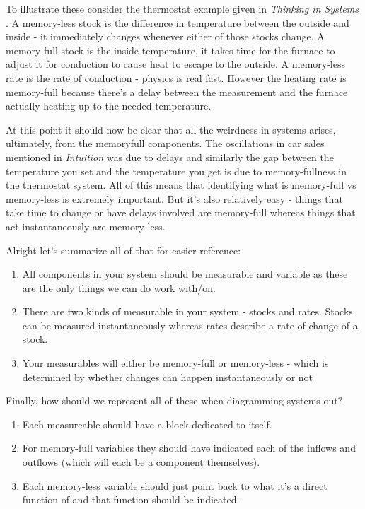 \documentclass[11pt,a5paper]{book}
\begin{document}
To illustrate these consider the thermostat example given in \textit{Thinking in Systems} \cite{meadows}. A memory-less stock is the difference in temperature between the outside and inside - it immediately changes whenever either of those stocks change. A memory-full stock is the inside temperature, it takes time for the furnace to adjust it for conduction to cause heat to escape to the outside. A memory-less rate is the rate of conduction - physics is real fast. However the heating rate is memory-full because there's a delay between the measurement and the furnace actually heating up to the needed temperature. 
\newline

At this point it should now be clear that all the weirdness in systems arises, ultimately, from the memoryfull components. The oscillations in car sales mentioned in \textit{Intuition} was due to delays and similarly the gap between the temperature you set and the temperature you get is due to memory-fullness in the thermostat system. All of this means that identifying what is memory-full vs memory-less is extremely important. But it's also relatively easy - things that take time to change or have delays involved are memory-full whereas things that act instantaneously are memory-less. 
\newline

Alright let's summarize all of that for easier reference:

\begin{enumerate}
\item All components in your system should be measurable and variable as these are the only things we can do work with/on.
\item There are two kinds of measurable in your system - stocks and rates. Stocks can be measured instantaneously whereas rates describe a rate of change of a stock.
\item Your measurables will either be memory-full or memory-less - which is determined by whether changes can happen instantaneously or not
\end{enumerate}

Finally, how should we represent all of these when diagramming systems out? 

\begin{enumerate}
\item Each measureable should have a block dedicated to itself. 
\item For memory-full variables they should have indicated each of the inflows and outflows (which will each be a component themselves).
\item Each memory-less variable should just point back to what it's a direct function of and that function should be indicated.
\end{enumerate}
\end{document}
